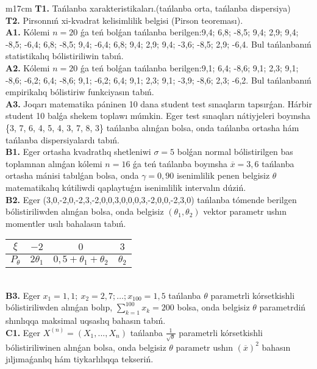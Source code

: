 \documentclass{article}
\begin{document}
\begin{tabular}{m{17cm}}
\textbf{T1.} 
Tańlanba xarakteristikaları.(tańlanba orta, tańlanba dispersiya)
 \\
\textbf{T2.} 
Pirsonnıń xi-kvadrat kelisimlilik belgisi (Pirson teoreması).
 \\
\textbf{A1.} 
Kólemi \(n = 20\) ǵa teń bolǵan tańlanba berilgen:9,4; 6,8; -8,5; 9,4; 2,9; 9,4; -8,5; -6,4; 6,8; -8,5; 9,4; -6,4; 6,8; 9,4; 2,9; 9,4; -3,6; -8,5; 2,9; -6,4. Bul tańlanbanıń statistikalıq bólistiriliwin tabıń.
 \\
\textbf{A2.} 
Kólemi \(n = 20\) ǵa teń bolǵan tańlanba berilgen:9,1; 6,4; -8,6; 9,1; 2,3; 9,1; -8,6; -6,2; 6,4; -8,6; 9,1; -6,2; 6,4; 9,1; 2,3; 9,1; -3,9; -8,6; 2,3; -6,2. Bul tańlanbanıń empirikalıq bólistiriw funkciyasın tabıń.
 \\
\textbf{A3.} 
Joqarı matematika páninen 10 dana student test sınaqların tapsırǵan. Hárbir student 10 balǵa shekem toplawı múmkin. Eger test sınaqları nátiyjeleri boyınsha \{3, 7, 6, 4, 5, 4, 3, 7, 8, 3\} tańlanba alınǵan bolsa, onda tańlanba ortasha hám tańlanba dispersiyalardı tabıń.
 \\
\textbf{B1.} 
Eger ortasha kvadratlıq shetleniwi \(\sigma = 5\) bolǵan normal bólistirilgen bas toplamnan alınǵan kólemi \(n = 16\) ǵa teń tańlanba boyınsha \(\overline{x} = 3,6\) tańlanba ortasha mánisi tabılǵan bolsa, onda \(\gamma = 0,90\) isenimlilik penen belgisiz \(\theta\) matematikalıq kútiliwdi qaplaytuǵın isenimlilik intervalın dúziń.
 \\
\textbf{B2.} 
Eger (3,0,-2,0,-2,3,-2,0,0,3,0,0,0,3,-2,0,0,-2,3,0) tańlanba tómende berilgen bólistiriliwden alınǵan bolsa, onda belgisiz \(\left( \theta_{1},\theta_{2} \right)\) vektor parametr ushın momentler usılı bahalasın tabıń.
\begin{tabular}{|c|c|c|c|}
  \hline
$\xi$ &
$- 2$ &
$0$ &
$3$\\
\hline
\(P_{\theta}\) & \({2\theta}_{1}\) & \(0,5 + \theta_{1} + \theta_{2}\) & \(\theta_{2}\) \\
\hline
\end{tabular}
 \\
\textbf{B3.} 
Eger \(x_{1} = 1,1;\ x_{2} = 2,7;\ldots;x_{100} = 1,5\) tańlanba \(\theta\) parametrli kórsetkishli bólistiriliwden alınǵan bolıp, \(\sum_{k = 1}^{100}x_{k} = 200\) bolsa, onda belgisiz \(\theta\) parametrdiń shınlıqqa maksimal uqsaslıq bahasın tabıń.
 \\
\textbf{C1.} 
Eger \(X^{(n)} = \left( X_{1},...,X_{n} \right)\) tańlanba \(\frac{1}{\sqrt{\theta}}\) parametrli kórsetkishli bólistiriliwinen alınǵan bolsa, onda belgisiz \(\theta\) parametr ushın \((\overline{x})^{2}\) bahasın jıljımaǵanlıq hám tiykarlılıqqa tekseriń.

\end{tabular}
\end{document}
